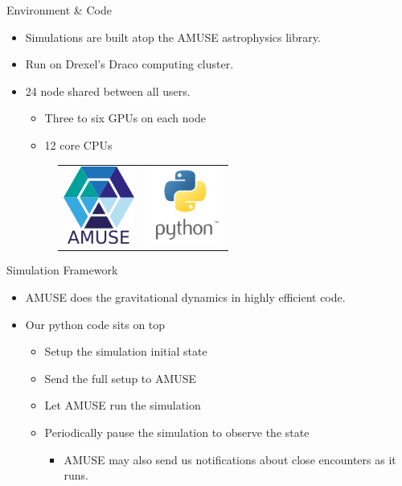 \documentclass{beamer}
\begin{document}
\begin{frame}{Environment \& Code}
    \begin{itemize}
        \item Simulations are built atop the AMUSE astrophysics library.
        \item Run on Drexel's Draco computing cluster.
        \item 24 node shared between all users.
        \begin{itemize}
            \item Three to six GPUs on each node
            \item 12 core CPUs
        \end{itemize}
        \begin{figure}
            \centering
            \begin{tabular}{cc}
                \includegraphics[height=1in]{AmuseLogo} & \includegraphics[height=1in]{PythonLogo}
            \end{tabular}
        \end{figure}
    \end{itemize}
\end{frame}

\begin{frame}{Simulation Framework}
    \begin{itemize}
        \item AMUSE does the gravitational dynamics in highly efficient code.
        \item Our python code sits on top
        \begin{itemize}
            \item Setup the simulation initial state
            \item Send the full setup to AMUSE
            \item Let AMUSE run the simulation
            \item Periodically pause the simulation to observe the state
                \begin{itemize}
                    \item AMUSE may also send us notifications about close encounters
                        as it runs.
                \end{itemize}
        \end{itemize}
    \end{itemize}
\end{frame}
\end{document}
